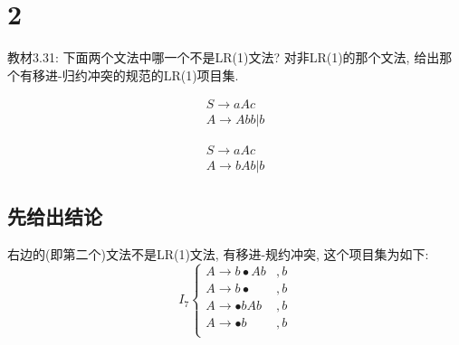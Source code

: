 \documentclass[UTF8]{article}
\newcommand{\blt}{\bullet}
\begin{document}
\newpage
\section*{2}
\noindent 教材3.31: 下面两个文法中哪一个不是LR(1)文法? 对非LR(1)的那个文法, 给出那个有移进-归约冲突的规范的LR(1)项目集.\\
\begin{minipage}{\linewidth/3}
$$\begin{array}{l}
S\rightarrow aAc\\
A\rightarrow Abb|b
\end{array}$$
\end{minipage}
\begin{minipage}{\linewidth/3}
$$\begin{array}{l}
S\rightarrow aAc\\
A\rightarrow bAb|b
\end{array}$$
\end{minipage}
\subsection*{先给出结论}
\noindent 右边的(即第二个)文法不是LR(1)文法, 有移进-规约冲突, 这个项目集为如下:
	$$I_7\left\{\begin{array}{ll}
	A\rightarrow b\blt Ab & ,b\\
	A\rightarrow b\blt & ,b\\
	A\rightarrow \blt bAb & ,b\\
	A\rightarrow \blt b & ,b\\
	\end{array}\right.$$
\end{document}
